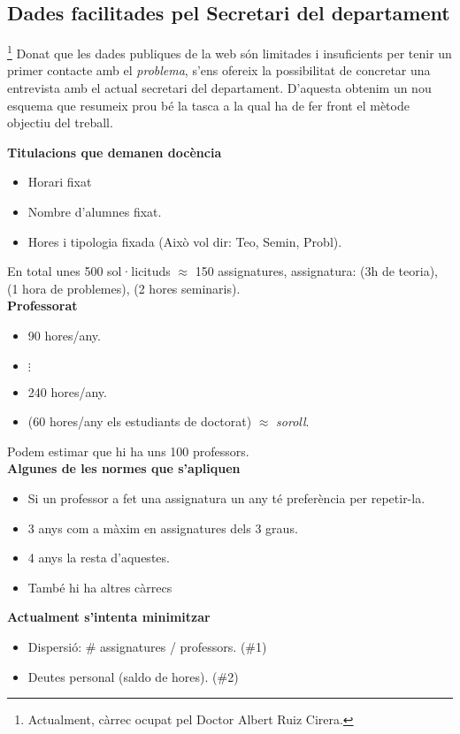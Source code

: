 \documentclass[10pt,twocolumn]{article}
\begin{document}
\subsection{Dades facilitades pel Secretari del departament}\footnote{Actualment, càrrec ocupat pel Doctor Albert Ruiz Cirera.}
Donat que les dades publiques de la web són limitades i insuficients per tenir un primer contacte amb el \textit{problema}, s'ens ofereix la possibilitat de concretar una entrevista amb el actual secretari del departament. D'aquesta obtenim un nou esquema que resumeix prou bé la tasca a la qual ha de fer front el mètode objectiu del treball.
\vspace{3mm}

\begin{tcolorbox}[colback=black!1,title=\textbf{Dades del funcionament intern del \textit{model actual}},coltitle=black,colbacktitle=black!10]
	\textbf{Titulacions que demanen docència}
	\begin{itemize}
		\item Horari fixat
		\item Nombre d'alumnes fixat.
		\item Hores i tipologia fixada (Això vol dir: Teo, Semin, Probl).
	\end{itemize}
	En total unes 500 sol·licituds $\approx$ 150 assignatures, assignatura: (3h de teoria), (1 hora de problemes), (2 hores seminaris).
	\\
	\textbf{Professorat}
	\begin{itemize}
		\item 90 hores/any.
		\item $\vdots$
		\item 240 hores/any.
		\item (60 hores/any els estudiants de doctorat) $\approx$ \textit{soroll}.
	\end{itemize}
	Podem estimar que hi ha uns 100 professors.\\
	\textbf{Algunes de les normes que s'apliquen}
	\begin{itemize}
		\item Si un professor a fet una assignatura un any  té preferència per repetir-la.
		\item 3 anys com a màxim en assignatures dels 3 graus.
		\item 4 anys la resta d'aquestes.
		\item També hi ha altres càrrecs 
	\end{itemize}
	\textbf{Actualment s'intenta minimitzar}
	\begin{itemize}
		\item Dispersió: \# assignatures / professors. (\#1)
		\item Deutes personal (saldo de hores). (\#2)
	\end{itemize}
	\end{tcolorbox}
\end{document}
